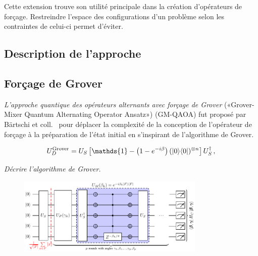 Cette extension trouve son utilité principale dans la création d'opérateurs de forçage. Restreindre l'espace des configurations d'un problème selon les contraintes de celui-ci permet d'éviter.



\subsection{Description de l'approche}





\subsection{Forçage de Grover}

\textit{L'approche quantique des opérateurs alternants avec forçage de Grover} («Grover-Mixer Quantum Alternating Operator Ansatz») (GM-QAOA) fut proposé par Bärtschi et coll.~\cite{bartschiGroverMixersQAOA2020} pour déplacer la complexité de la conception de l'opérateur de forçage à la préparation de l'état initial en s'inspirant de l'algorithme de Grover. 



\begin{equation}
    U_D^{\mathrm{Grover}} = U_{S}\left[ \mathds{1} -\left(1-e^{-i \beta}\right) (\ket{0}\!\bra{0})^{\otimes n} \right] U_{S}^{\dagger} \,,
\end{equation}

\textcolor{mydarkred}{\textit{Décrire l'algorithme de Grover.}}

\begin{figure}[ht!]
    \centering
    \includegraphics[width=0.8\textwidth]{figures/gm-qaoa}
    \caption[Circuit GM-QAOA]{}
    \label{fig:gm-qaoa}
\end{figure}


